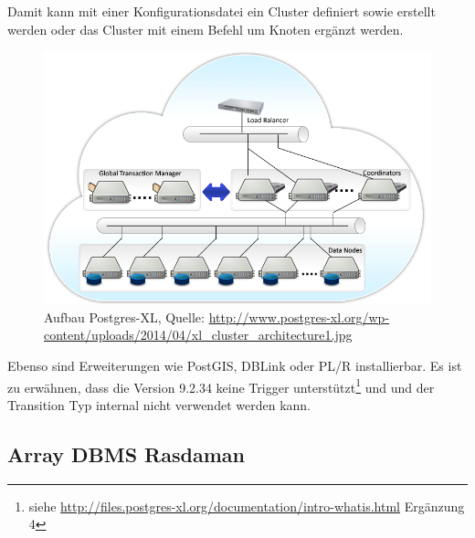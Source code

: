Damit kann mit einer Konfigurationsdatei ein Cluster definiert sowie erstellt werden oder das Cluster mit einem Befehl um Knoten ergänzt werden.
\begin{figure}[h!]
\centering
\includegraphics[width=.7\textwidth]{Abbildungen/postgresxl-structure.jpg}
\caption[Aufbau Postgres-XL]{Aufbau Postgres-XL, Quelle: \url{http://www.postgres-xl.org/wp-content/uploads/2014/04/xl_cluster_architecture1.jpg}}
\label{fig:postgresxl}
\end{figure}
Ebenso sind Erweiterungen wie PostGIS, DBLink oder PL/R installierbar.
Es ist zu erwähnen, dass die Version 9.2.34 keine Trigger unterstützt\footnote{siehe \url{http://files.postgres-xl.org/documentation/intro-whatis.html} Ergänzung 4} und und der Transition Typ internal nicht verwendet werden kann.

\subsection{Array DBMS Rasdaman}

